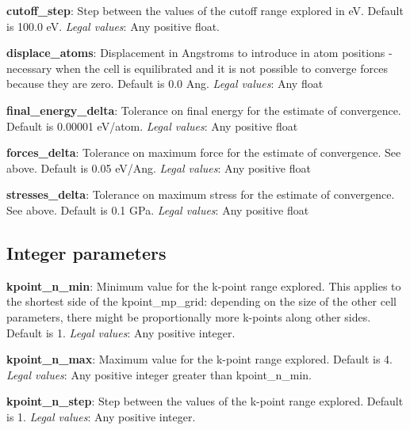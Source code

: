 \documentclass[10pt]{article}
\begin{document}
\textbf{cutoff\_step}: Step between the values of the cutoff range explored in 
eV. Default is 100.0 eV.\newline
\textit{Legal values}: Any positive float.\newline

\textbf{displace\_atoms}: Displacement in Angstroms to introduce in atom 
positions - necessary when the cell is equilibrated and it is not possible to 
converge forces because they are zero. Default is 0.0 Ang.\newline
\textit{Legal values}: Any float\newline

\textbf{final\_energy\_delta}: Tolerance on final energy for the estimate of 
convergence. Default is 0.00001 eV/atom.\newline
\textit{Legal values}: Any positive float\newline

\textbf{forces\_delta}: Tolerance on maximum force for the estimate of 
convergence. See above. Default is 0.05 eV/Ang.\newline
\textit{Legal values}: Any positive float\newline

\textbf{stresses\_delta}: Tolerance on maximum stress for the estimate of 
convergence. See above. Default is 0.1 GPa.\newline
\textit{Legal values}: Any positive float\newline

\subsection{Integer parameters}

\textbf{kpoint\_n\_min}: Minimum value for the k-point range explored. This 
applies to the shortest side of the kpoint\_mp\_grid: depending on the size of 
the other cell parameters, there might be proportionally more k-points along 
other sides. Default is 1.\newline
\textit{Legal values}: Any positive integer.\newline

\textbf{kpoint\_n\_max}: Maximum value for the k-point range explored. Default 
is 4.\newline
\textit{Legal values}: Any positive integer greater than kpoint\_n\_min.\newline

\textbf{kpoint\_n\_step}: Step between the values of the k-point range explored. 
Default is 1.\newline
\textit{Legal values}: Any positive integer.\newline
\end{document}
